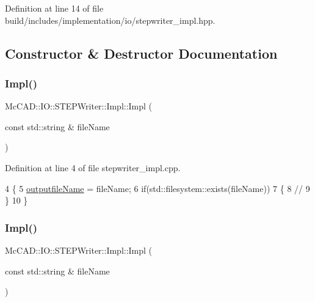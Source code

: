 Definition at line 14 of file build/includes/implementation/io/stepwriter\+\_\+impl.\+hpp.



\subsection{Constructor \& Destructor Documentation}
\mbox{\label{classMcCAD_1_1IO_1_1STEPWriter_1_1Impl_a8275f8185571fed985a30b1813e3ff03}} 
\subsubsection{\texorpdfstring{Impl()}{Impl()}\hspace{0.1cm}{\footnotesize\ttfamily [1/2]}}
{\footnotesize\ttfamily Mc\+C\+A\+D\+::\+I\+O\+::\+S\+T\+E\+P\+Writer\+::\+Impl\+::\+Impl (\begin{DoxyParamCaption}\item[{const std\+::string \&}]{file\+Name }\end{DoxyParamCaption})}



Definition at line 4 of file stepwriter\+\_\+impl.\+cpp.


\begin{DoxyCode}
4                                                     \{
5   \hyperlink{classMcCAD_1_1IO_1_1STEPWriter_1_1Impl_ae943ccd3f778c6c211f67be535fdc93f}{outputfileName} = fileName;
6   \textcolor{keywordflow}{if}(std::filesystem::exists(fileName))
7     \{
8       \textcolor{comment}{//}
9     \}
10 \}
\end{DoxyCode}
\mbox{\label{classMcCAD_1_1IO_1_1STEPWriter_1_1Impl_a8275f8185571fed985a30b1813e3ff03}} 
\subsubsection{\texorpdfstring{Impl()}{Impl()}\hspace{0.1cm}{\footnotesize\ttfamily [2/2]}}
{\footnotesize\ttfamily Mc\+C\+A\+D\+::\+I\+O\+::\+S\+T\+E\+P\+Writer\+::\+Impl\+::\+Impl (\begin{DoxyParamCaption}\item[{const std\+::string \&}]{file\+Name }\end{DoxyParamCaption})}



